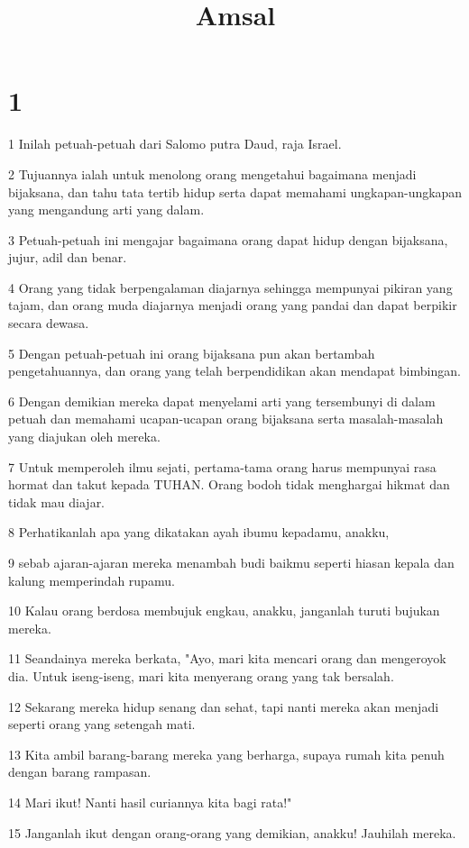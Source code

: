 

\title{Amsal}


\chapter{1}

\par 1 Inilah petuah-petuah dari Salomo putra Daud, raja Israel.
\par 2 Tujuannya ialah untuk menolong orang mengetahui bagaimana menjadi bijaksana, dan tahu tata tertib hidup serta dapat memahami ungkapan-ungkapan yang mengandung arti yang dalam.
\par 3 Petuah-petuah ini mengajar bagaimana orang dapat hidup dengan bijaksana, jujur, adil dan benar.
\par 4 Orang yang tidak berpengalaman diajarnya sehingga mempunyai pikiran yang tajam, dan orang muda diajarnya menjadi orang yang pandai dan dapat berpikir secara dewasa.
\par 5 Dengan petuah-petuah ini orang bijaksana pun akan bertambah pengetahuannya, dan orang yang telah berpendidikan akan mendapat bimbingan.
\par 6 Dengan demikian mereka dapat menyelami arti yang tersembunyi di dalam petuah dan memahami ucapan-ucapan orang bijaksana serta masalah-masalah yang diajukan oleh mereka.
\par 7 Untuk memperoleh ilmu sejati, pertama-tama orang harus mempunyai rasa hormat dan takut kepada TUHAN. Orang bodoh tidak menghargai hikmat dan tidak mau diajar.
\par 8 Perhatikanlah apa yang dikatakan ayah ibumu kepadamu, anakku,
\par 9 sebab ajaran-ajaran mereka menambah budi baikmu seperti hiasan kepala dan kalung memperindah rupamu.
\par 10 Kalau orang berdosa membujuk engkau, anakku, janganlah turuti bujukan mereka.
\par 11 Seandainya mereka berkata, "Ayo, mari kita mencari orang dan mengeroyok dia. Untuk iseng-iseng, mari kita menyerang orang yang tak bersalah.
\par 12 Sekarang mereka hidup senang dan sehat, tapi nanti mereka akan menjadi seperti orang yang setengah mati.
\par 13 Kita ambil barang-barang mereka yang berharga, supaya rumah kita penuh dengan barang rampasan.
\par 14 Mari ikut! Nanti hasil curiannya kita bagi rata!"
\par 15 Janganlah ikut dengan orang-orang yang demikian, anakku! Jauhilah mereka.
